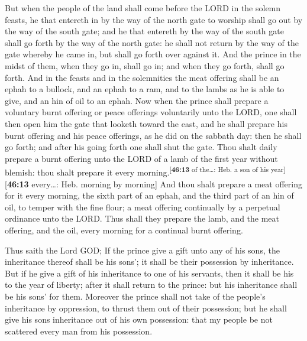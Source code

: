  But when the people of the land shall come before the
LORD in the solemn feasts, he that entereth in by the way of the north
gate to worship shall go out by the way of the south gate; and he that
entereth by the way of the south gate shall go forth by the way of the
north gate: he shall not return by the way of the gate whereby he came
in, but shall go forth over against it.  And the prince
in the midst of them, when they go in, shall go in; and when they go
forth, shall go forth.  And in the feasts and in the
solemnities the meat offering shall be an ephah to a bullock, and an
ephah to a ram, and to the lambs as he is able to give, and an hin of
oil to an ephah.  Now when the prince shall prepare a
voluntary burnt offering or peace offerings voluntarily unto the LORD,
one shall then open him the gate that looketh toward the east, and he
shall prepare his burnt offering and his peace offerings, as he did on
the sabbath day: then he shall go forth; and after his going forth one
shall shut the gate.  Thou shalt daily prepare a burnt
offering unto the LORD of a lamb of the first year without blemish: thou
shalt prepare it every morning.\textsuperscript{{[}\textbf{46:13} of
the\ldots: Heb. a son of his year{]}}{[}\textbf{46:13} every\ldots: Heb.
morning by morning{]}  And thou shalt prepare a meat
offering for it every morning, the sixth part of an ephah, and the third
part of an hin of oil, to temper with the fine flour; a meat offering
continually by a perpetual ordinance unto the LORD.  Thus
shall they prepare the lamb, and the meat offering, and the oil, every
morning for a continual burnt offering.

 Thus saith the Lord GOD; If the prince give a gift unto
any of his sons, the inheritance thereof shall be his sons'; it shall be
their possession by inheritance.  But if he give a gift
of his inheritance to one of his servants, then it shall be his to the
year of liberty; after it shall return to the prince: but his
inheritance shall be his sons' for them.  Moreover the
prince shall not take of the people's inheritance by oppression, to
thrust them out of their possession; but he shall give his sons
inheritance out of his own possession: that my people be not scattered
every man from his possession.

